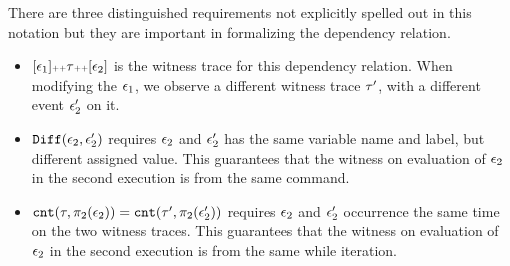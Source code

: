 There are three distinguished requirements not explicitly spelled out in this notation but they are 
important in formalizing the 
dependency relation.
\begin{itemize}
\item $[\mathtt{\epsilon}_1 ] {\scriptscriptstyle ++} \mathtt{\tau} {\scriptscriptstyle ++} [\mathtt{\epsilon}_2]$ is the witness trace for this dependency relation. When 
modifying the $\mathtt{\epsilon}_1$, we observe a different witness trace $\mathtt{\tau}'$, with a different event $\mathtt{\epsilon}_2'$ on it.

\item $\mathtt{Diff}(\mathtt{\epsilon}_2, \mathtt{\epsilon}_2')$ requires $\mathtt{\epsilon}_2$ and $\mathtt{\epsilon}_2'$ has the same variable name and label, but different assigned value.
This guarantees that the witness on evaluation of $\mathtt{\epsilon}_2$ in the second execution is 
from the same command.
\item $\mathtt{cnt}(\mathtt{\tau}, \pi_2(\mathtt{\epsilon}_2))
= 
\mathtt{cnt}(\mathtt{\tau}', \pi_2(\mathtt{\epsilon}_2'))$ requires $\mathtt{\epsilon}_2$ and $\mathtt{\epsilon}_2'$ occurrence the same time on the two witness traces.
This guarantees that the witness on evaluation of $\mathtt{\epsilon}_2$ in the second execution is 
from the same while iteration.
\end{itemize}
